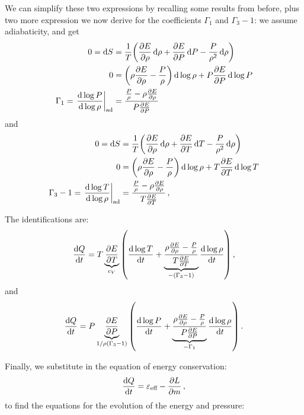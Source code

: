\documentclass[main.tex]{subfiles}
\begin{document}
We can simplify these two expressions by recalling some results from before, plus two more expression we now derive for the coefficients \(\Gamma_1\) and \(\Gamma_3 -1\): we assume adiabaticity, and get
%
\begin{align}
0=\dd{S} &= \frac{1}{T} \qty(\pdv{E}{\rho } \dd{\rho } + \pdv{E}{P } \dd{P} - \frac{P}{\rho^2} \dd{\rho })  \\
0&= \qty(\rho \pdv{E}{\rho } - \frac{P}{\rho } ) \dd{\log \rho }   + P \pdv{E}{P} \dd{\log P}  \\
\Gamma_1 = \left. \dv{\log P}{\log \rho } \right\vert_{\text{ad}} &= \frac{\frac{P}{\rho } - \rho \pdv{E}{\rho }}{P \pdv{E}{P}}
\,
\end{align}
%
and 
%
\begin{align}
0 = \dd{S} &= \frac{1}{T} \qty(\pdv{E}{\rho } \dd{\rho } + \pdv{E}{T} \dd{T} - \frac{P}{\rho^2} \dd{\rho })  \\
0&= \qty(\rho \pdv{E}{ \rho } - \frac{P}{\rho }) \dd{\log \rho } + T \pdv{E}{T} \dd{\log T}  \\
\Gamma_3 -1 = \left. \dv{\log T}{\log \rho } \right\vert_{\text{ad}} &= \frac{\frac{P}{\rho } - \rho \pdv{E}{\rho }}{T \pdv{E}{T}}
\,,
\end{align}
%


The identifications are: 
%
\begin{align}
\dv{Q}{t} = T \underbrace{\pdv{E}{T}}_{c_V} \qty(\dv{\log T}{t} + \underbrace{\frac{\rho \pdv{E}{\rho } - \frac{P}{\rho }}{T \pdv{E}{T}}}_{- (\Gamma_3 - 1) } \dv{\log \rho }{t})
\,,
\end{align}
%
and
%
%
\begin{align}
\dv{Q}{t} = P \underbrace{\pdv{E}{P}}_{1/ \rho (\Gamma_3 -1)} \qty(\dv{\log P}{t} + \underbrace{\frac{\rho \pdv{E}{\rho } - \frac{P}{\rho }}{P \pdv{E}{P}}}_{- \Gamma_1 } \dv{\log \rho }{t})
\,.
\end{align}

Finally, we substitute in the equation of energy conservation: 
%
\begin{align}
\dv{Q}{t} = \varepsilon_{\text{eff}} - \pdv{L}{m}
\,,
\end{align}
%
to find the equations for the evolution of the energy and pressure:
%
\end{document}
